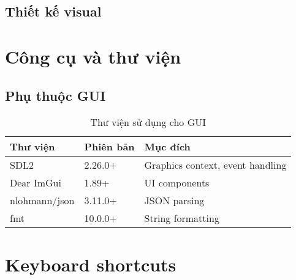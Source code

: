 \subsection{Thiết kế visual}


\section{Công cụ và thư viện}

\subsection{Phụ thuộc GUI}

\begin{table}[H]
\centering
\caption{Thư viện sử dụng cho GUI}
\begin{tabular}{lll}
\toprule
\textbf{Thư viện} & \textbf{Phiên bản} & \textbf{Mục đích} \\
\midrule
SDL2 & 2.26.0+ & Graphics context, event handling \\
Dear ImGui & 1.89+ & UI components \\
nlohmann/json & 3.11.0+ & JSON parsing \\
fmt & 10.0.0+ & String formatting \\
\bottomrule
\end{tabular}
\end{table}

\section{Keyboard shortcuts}

